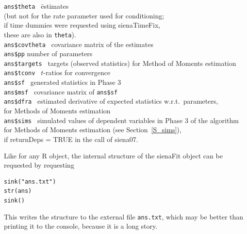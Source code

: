 \documentclass[a4paper,fleqn,11pt]{article}
\newcommand{\+}{\, + \,}
\newcommand{\R}{{\sf R }}
\begin{document}
\begin{tabbing}
 \texttt{ans\$theta  }\hspace{3em}    \=  estimates  \\
                                      \> (but not for the rate parameter used
                                                       for conditioning;\\
                                      \> if time dummies were requested using
                                            \textsf{sienaTimeFix},\\
                                      \> these are also in \texttt{theta}). \\
 \texttt{ans\$covtheta   }            \> covariance matrix of the estimates \\
 \texttt{ans\$pp}                     \> number of parameters  \\
 \texttt{ans\$targets }               \> targets (observed statistics)
                                         for Method of Moments estimation  \\
 \texttt{ans\$tconv   }               \> $t$-ratios for convergence  \\
 \texttt{ans\$sf    }                 \>  generated statistics in Phase 3 \\
 \texttt{ans\$msf   }                 \>  covariance matrix of
                                           \texttt{ans\$sf    } \\
 \texttt{ans\$dfra  }                 \> estimated derivative of expected
                                            statistics w.r.t.\ parameters,  \\
                                     \>   for Methods of Moments estimation  \\
 \texttt{ans\$sims }               \> simulated values of dependent variables
                                      in Phase 3 of the algorithm     \\
                                    \>     for Methods of Moments estimation
                                        (see Section~\ref{S_sims}),    \\
                                       \>  if \textsf{returnDeps = TRUE}
                                        in the call of \textsf{siena07}.
\end{tabbing}
Like for any \R object, the internal structure of the \textsf{sienaFit} object
can be requested by requesting
\begin{verbatim}
sink("ans.txt")
str(ans)
sink()
\end{verbatim}
This writes the structure to the external file \texttt{ans.txt}, which may
be better than printing it to the console, because it is a long story.
\end{document}
